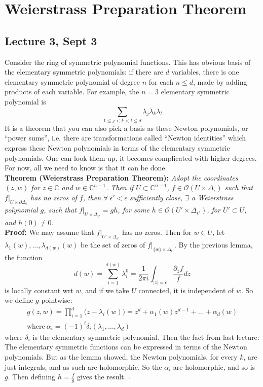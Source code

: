 \documentclass[12pt]{report}
\theoremstyle{definition}
\theoremstyle{remark}
\numberwithin{equation}{section}
\theoremstyle{definition}
\newcommand{\bb}[1]{\mathbb{#1}}
\newcommand{\mqed}{\hfill\newline\null \hfill$\square$\\ }
\begin{document}
\chapter{Weierstrass Preparation Theorem}
\section*{Lecture 3, Sept 3}
\label{sec:3}Consider the ring of symmetric polynomial functions. This has obvious basis of the elementary symmetric polynomials: if there are $d$ variables, there is one elementary symmetric polynomial of degree $n$ for each $n \leq d$, made by adding products of each variable. For example, the $n = 3$ elementary symmetric polynomial is 
$$
	\sum_{1\leq j < k < l \leq d} \lambda_j\lambda_k\lambda_l
$$
It is a theorem that you can also pick a basis as these Newton polynomials, or ``power sums'', i.e. there are transformations called ``Newton identities'' which express these Newton polynomials in terms of the elementary symmetric polynomials. One can look them up, it becomes complicated with higher degrees. For now, all we need to know is that it can be done. \\
\textbf{Theorem (Weierstrass Preparation Theorem):}\textit{ Adopt the coordinates $(z,w)$ for $z \in \bb C$ and $w \in \bb C^{n-1}$. Then if $U \subset \bb C^{n-1}$, $f \in \mathcal{O}(U \times \Delta_\epsilon)$ such that $f|_{U \times \partial \Delta_{\epsilon}}$ has no zeros of $f$, then $\forall\ \epsilon' < \epsilon$ sufficiently close, $\exists$ a Weierstrass polynomial $g$, such that $f|_{U \times \Delta_{\epsilon'}} = gh$, for some $h \in \mathcal{O}(U' \times \Delta_{\epsilon'})$, for $U' \subset U$, and $h(0) \ne 0$.  }\\
\textbf{Proof: }We may assume that $f|_{U' \times \Delta_{\epsilon'}}$ has no zeros. Then for $w \in U$, let $ \lambda_1(w),\dots,\lambda_{d(w)}(w)$ be the set of zeros of $f|_{\{w\}\times \Delta_{\epsilon'}}$. By the previous lemma, the function $$
 d(w) = \sum_{i = 1}^{d(w)}\lambda_i^0 = \frac{1}{2\pi i}\int_{|z| = \epsilon} \frac{\partial_z f}{f} dz
$$
is locally constant wrt $w$, and if we take $U$ connected, it is independent of $w$. So we define $g$ pointwise:
\begin{gather*}
	g(z,w) = \prod_{i = 1}^d\Big(z-\lambda_i(w)\Big) = z^d + \alpha_1(w)z^{d-1} + \dots + \alpha_d(w)\\
	\text{where}\  \alpha_i = (-1)^i\delta_i(\lambda_1,\dots,\lambda_d)
\end{gather*}
where $\delta_i$ is the elementary symmetric polynomial. Then the fact from last lecture: The elementary symmetric functions can be expressed in terms of the Newton polynomials. But as the lemma showed, the Newton polynomials, for every $k$, are just integrals, and as such are holomorphic. So the $\alpha_i$ are holomorphic, and so is $g$. Then defining $h = \frac{f}{g}$ gives the result. \mqed\\
\end{document}
